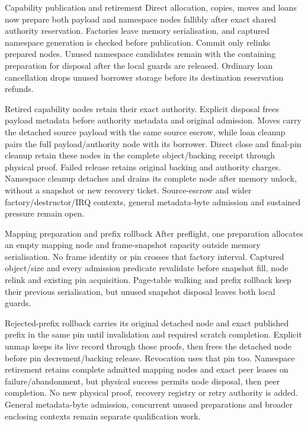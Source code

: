\begin{implementationdetail}{Capability publication and retirement}
Direct allocation, copies, moves and loans now prepare both payload and namespace
nodes fallibly after exact shared authority reservation. Factories leave memory
serialisation, and captured namespace generation is checked before publication.
Commit only relinks prepared nodes. Unused namespace candidates remain with the
containing preparation for disposal after the local guards are released.
Ordinary loan cancellation drops unused borrower storage before its destination
reservation refunds.

Retired capability nodes retain their exact authority. Explicit disposal frees
payload metadata before authority metadata and original admission. Moves carry
the detached source payload with the same source escrow, while loan cleanup pairs the
full payload/authority node with its borrower. Direct close and final-pin cleanup
retain these nodes in the complete object/backing receipt through physical proof.
Failed release retains original backing and authority charges. Namespace cleanup
detaches and drains its complete node after memory unlock, without a snapshot or
new recovery ticket. Source-escrow and wider factory/destructor/IRQ contexts,
general metadata-byte admission and sustained pressure remain open.
\end{implementationdetail}

\begin{implementationdetail}{Mapping preparation and prefix rollback}
After preflight, one preparation allocates an empty mapping node and frame-snapshot
capacity outside memory serialisation. No frame identity or pin crosses that
factory interval. Captured object/size and every admission predicate revalidate
before snapshot fill, node relink and existing pin acquisition. Page-table walking
and prefix rollback keep their previous serialisation, but unused snapshot disposal
leaves both local guards.

Rejected-prefix rollback carries its original detached node and exact published
prefix in the same pin until invalidation and required scratch completion.
Explicit unmap keeps its live record through those proofs, then frees the detached
node before pin decrement/backing release. Revocation uses that pin too. Namespace
retirement retains complete admitted mapping nodes and exact peer leases on
failure/abandonment, but physical success permits node disposal, then peer completion.
No new physical proof, recovery registry or retry authority is added. General
metadata-byte admission, concurrent unused preparations and broader enclosing
contexts remain separate qualification work.
\end{implementationdetail}

